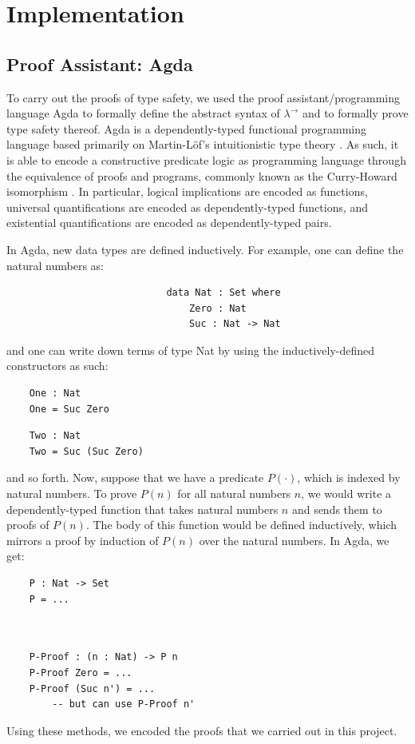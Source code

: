 \documentclass[12pt, letterpaper]{article}
\begin{document}
\section{Implementation}

\subsection{Proof Assistant: Agda}
To carry out the proofs of type safety, we used the proof assistant/programming language Agda to formally define the abstract syntax of $\lambda^{\to}$ and to formally prove type safety thereof. Agda is a dependently-typed functional programming language based primarily on Martin-L\"{o}f's intuitionistic type theory \cite{agda-wiki}. As such, it is able to encode a constructive predicate logic as programming language through the equivalence of proofs and programs, commonly known as the Curry-Howard isomorphism \cite{howard}. In particular, logical implications are encoded as functions, universal quantifications are encoded as dependently-typed functions, and existential quantifications are encoded as dependently-typed pairs.

In Agda, new data types are defined inductively. For example, one can define the natural numbers as:
\begin{Verbatim}
							data Nat : Set where
								Zero : Nat
								Suc : Nat -> Nat	
\end{Verbatim}
and one can write down terms of type Nat by using the inductively-defined constructors as such:
\begin{multicols}{2}
\begin{Verbatim}
	One : Nat
	One = Suc Zero
\end{Verbatim}
\begin{Verbatim}
	Two : Nat
	Two = Suc (Suc Zero)
\end{Verbatim}
\end{multicols}
\begin{flushleft}
and so forth. Now, suppose that we have a predicate $P(\cdot)$, which is indexed by natural numbers. To prove $P(n)$ for all natural numbers $n$, we would write a dependently-typed function that takes natural numbers $n$ and sends them to proofs of $P(n)$. The body of this function would be defined inductively, which mirrors a proof by induction of $P(n)$ over the natural numbers. In Agda, we get:
\begin{multicols}{2}
\begin{Verbatim}
	P : Nat -> Set
	P = ...
	
	
\end{Verbatim}
\begin{Verbatim}
	P-Proof : (n : Nat) -> P n
	P-Proof Zero = ...
	P-Proof (Suc n') = ... 
		-- but can use P-Proof n'
\end{Verbatim}
\end{multicols}
Using these methods, we encoded the proofs that we carried out in this project.
\end{flushleft}
\end{document}
